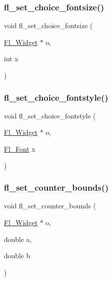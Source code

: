 \mbox{\label{forms_8_h_a13610133134a15947e1770005cab4abe}} 
\subsubsection{\texorpdfstring{fl\+\_\+set\+\_\+choice\+\_\+fontsize()}{fl\_set\_choice\_fontsize()}}
{\footnotesize\ttfamily void fl\+\_\+set\+\_\+choice\+\_\+fontsize (\begin{DoxyParamCaption}\item[{\hyperlink{class_fl___widget}{Fl\+\_\+\+Widget} $\ast$}]{o,  }\item[{int}]{x }\end{DoxyParamCaption})\hspace{0.3cm}{\ttfamily [inline]}}

\mbox{\label{forms_8_h_a6ce0681b3c2a1d1cb2165fcf109e33bc}} 
\subsubsection{\texorpdfstring{fl\+\_\+set\+\_\+choice\+\_\+fontstyle()}{fl\_set\_choice\_fontstyle()}}
{\footnotesize\ttfamily void fl\+\_\+set\+\_\+choice\+\_\+fontstyle (\begin{DoxyParamCaption}\item[{\hyperlink{class_fl___widget}{Fl\+\_\+\+Widget} $\ast$}]{o,  }\item[{\hyperlink{_enumerations_8_h_a2ac46d9f082834b969fffe490a03a709}{Fl\+\_\+\+Font}}]{x }\end{DoxyParamCaption})\hspace{0.3cm}{\ttfamily [inline]}}

\mbox{\label{forms_8_h_a4d3635b34f7de94e7d4353d692482774}} 
\subsubsection{\texorpdfstring{fl\+\_\+set\+\_\+counter\+\_\+bounds()}{fl\_set\_counter\_bounds()}}
{\footnotesize\ttfamily void fl\+\_\+set\+\_\+counter\+\_\+bounds (\begin{DoxyParamCaption}\item[{\hyperlink{class_fl___widget}{Fl\+\_\+\+Widget} $\ast$}]{o,  }\item[{double}]{a,  }\item[{double}]{b }\end{DoxyParamCaption})\hspace{0.3cm}{\ttfamily [inline]}}

